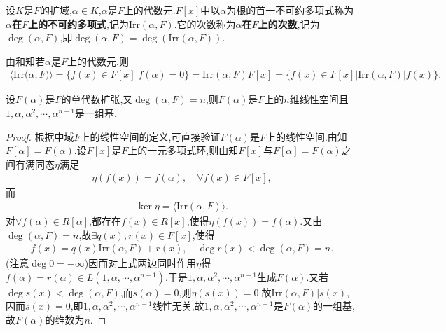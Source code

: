 \documentclass[../../main.tex]{subfiles}%
\begin{document}
\begin{definition}
设$K$是$F$的扩域,$\alpha\in K$,$\alpha$是$F$上的代数元.$F[x]$中以$\alpha$为根的首一不可约多项式称为\textbf{$\alpha$在$F$上的不可约多项式},记为$\mathrm{Irr}(\alpha,F)$.它的次数称为\textbf{$\alpha$在$F$上的次数},记为$\deg(\alpha,F)$,即$\deg(\alpha,F)=\deg(\mathrm{Irr}(\alpha,F))$.
\end{definition}
\begin{remark}
由和知若$\alpha$是$F$上的代数元,则
\begin{align*}
\langle \mathrm{Irr(}\alpha ,F)\rangle =\{f(x)\in F[x]|f(\alpha )=0\}
=\mathrm{Irr}(\alpha ,F)F[x]=\{f(x)\in F[x]|\mathrm{Irr}(\alpha ,F)|f(x)\}.
\end{align*}
\end{remark}

\begin{theorem}\label{theorem:抽象代数--定理3.1.4}
设$F(\alpha)$是$F$的单代数扩张,又$\deg(\alpha,F)=n$,则$F(\alpha)$是$F$上的$n$维线性空间且$1,\alpha,\alpha^2,\cdots,\alpha^{n-1}$是一组基.
\end{theorem}
\begin{proof}
根据中域$F$上的线性空间的定义,可直接验证$F(\alpha)$是$F$上的线性空间.由知$F[\alpha]=F(\alpha)$.设$F[x]$是$F$上的一元多项式环,则由知$F[x]$与$F[\alpha]=F(\alpha)$之间有满同态$\eta$满足
\begin{align*}
\eta(f(x))=f(\alpha),\quad \forall f(x)\in F[x],
\end{align*}
而
\begin{align*}
\ker\eta=\langle\mathrm{Irr}(\alpha,F)\rangle.
\end{align*}
对$\forall f(\alpha)\in R[\alpha]$,都存在$f(x)\in R[x]$,使得$\eta(f(x))=f(\alpha)$.又由$\deg(\alpha,F)=n$,故$\exists q(x),r(x)\in F[x]$,使得
\begin{align*}
f(x)=q(x)\mathrm{Irr}(\alpha,F)+r(x),\quad \deg r(x)<\deg(\alpha,F)=n.
\end{align*}
(注意$\deg0=-\infty$)因而对上式两边同时作用$\eta$得$f(\alpha)=r(\alpha)\in L(1,\alpha,\cdots,\alpha^{n-1})$.于是$1,\alpha,\alpha^2,\cdots,\alpha^{n-1}$生成$F(\alpha)$.又若$\deg s(x)<\deg(\alpha,F)$,而$s(\alpha)=0$,则$\eta(s(x))=0$.故$\mathrm{Irr}(\alpha,F)|s(x)$,因而$s(x)=0$,即$1,\alpha,\alpha^2,\cdots,\alpha^{n-1}$线性无关,故$1,\alpha,\alpha^2,\cdots,\alpha^{n-1}$是$F(\alpha)$的一组基,故$F(\alpha)$的维数为$n$.
\end{proof}
\end{document}
